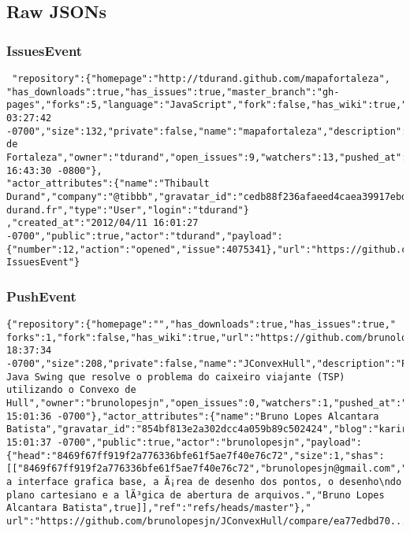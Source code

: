\documentclass[a4paper,10pt]{article}
\begin{document}
\subsection{Raw JSONs}
\subsubsection{IssuesEvent}

\begin{lstlisting}
 "repository":{"homepage":"http://tdurand.github.com/mapafortaleza",
"has_downloads":true,"has_issues":true,"master_branch":"gh-pages","forks":5,"language":"JavaScript","fork":false,"has_wiki":true,"url":"https://github.com/tdurand/mapafortaleza","created_at":"2011/09/29 03:27:42 -0700","size":132,"private":false,"name":"mapafortaleza","description":"Mapa de Fortaleza","owner":"tdurand","open_issues":9,"watchers":13,"pushed_at":"2012/02/29 16:43:30 -0800"},
"actor_attributes":{"name":"Thibault Durand","company":"@tibbb","gravatar_id":"cedb88f236afaeed4caea39917ebd0a7","blog":"http://www.thibault-durand.fr","type":"User","login":"tdurand"}
,"created_at":"2012/04/11 16:01:27 -0700","public":true,"actor":"tdurand","payload":{"number":12,"action":"opened","issue":4075341},"url":"https://github.com/tdurand/mapafortaleza/issues/12","type":"
IssuesEvent"}
\end{lstlisting}

\subsubsection{PushEvent}

\begin{lstlisting}
{"repository":{"homepage":"","has_downloads":true,"has_issues":true,"
forks":1,"fork":false,"has_wiki":true,"url":"https://github.com/brunolopesjn/JConvexHull","created_at":"2012/04/10 18:37:34 -0700","size":208,"private":false,"name":"JConvexHull","description":"Programa Java Swing que resolve o problema do caixeiro viajante (TSP) utilizando o Convexo de Hull","owner":"brunolopesjn","open_issues":0,"watchers":1,"pushed_at":"2012/04/11 15:01:36 -0700"},"actor_attributes":{"name":"Bruno Lopes Alcantara Batista","gravatar_id":"854bf813e2a302dcc4a059b89c502424","blog":"kariridev.blogspot.com","type":"User","login":"brunolopesjn","email":"brunolopesjn@gmail.com"},"created_at":"2012/04/11 15:01:37 -0700","public":true,"actor":"brunolopesjn","payload":{"head":"8469f67ff919f2a776336bfe61f5ae7f40e76c72","size":1,"shas":[["8469f67ff919f2a776336bfe61f5ae7f40e76c72","brunolopesjn@gmail.com","Criado a interface grafica base, a Ã¡rea de desenho dos pontos, o desenho\ndo plano cartesiano e a lÃ³gica de abertura de arquivos.","Bruno Lopes Alcantara Batista",true]],"ref":"refs/heads/master"},"
url":"https://github.com/brunolopesjn/JConvexHull/compare/ea77edbd70...8469f67ff9","type":"PushEvent"}
\end{lstlisting}
\end{document}
